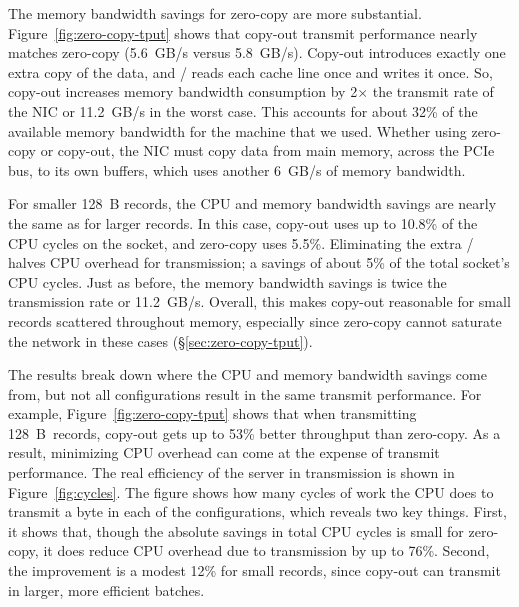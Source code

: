 The memory bandwidth savings for zero-copy are more substantial.
Figure~\ref{fig:zero-copy-tput} shows that copy-out transmit performance nearly
matches zero-copy (5.6~GB/s versus 5.8~GB/s). Copy-out introduces exactly one
extra copy of the data, and \memcpy/  reads each cache line once and writes it
once. So, copy-out increases memory bandwidth consumption
by 2$\times$ the transmit rate of the NIC or 11.2~GB/s in the worst case.  This
accounts for about 32\% of the available memory bandwidth for the machine that we used. Whether
using zero-copy or copy-out, the NIC must
copy data from main memory, across the PCIe bus, to its own buffers, which
uses another 6~GB/s of memory bandwidth.


For smaller 128~B records, the CPU and memory bandwidth savings are nearly the
same as for larger records.  In this case, copy-out uses up to 10.8\% of the
CPU cycles on the socket, and zero-copy uses 5.5\%.  Eliminating the extra
\memcpy/  halves CPU overhead for transmission; a savings of about 5\% of the
total socket's CPU cycles.  Just as before, the memory bandwidth savings is
twice the transmission rate or 11.2~GB/s.  Overall, this makes copy-out
reasonable for small records scattered throughout memory, especially since zero-copy cannot saturate the network in these cases (\S\ref{sec:zero-copy-tput}).


The results break down where the CPU and memory bandwidth savings come from,
but not all configurations result in the same transmit performance. For
example, Figure~\ref{fig:zero-copy-tput} shows that when transmitting
128~B~records, copy-out gets up to 53\% better throughput than zero-copy. As a result,
minimizing CPU overhead can come at the expense of transmit
performance.  The real efficiency of the server in transmission is shown in
Figure~\ref{fig:cycles}. The figure shows how many cycles of work the CPU does
to transmit a byte in each of the configurations, which reveals two key things.
First, it shows that, though the absolute savings in total CPU cycles is small
for zero-copy, it does reduce CPU overhead due to transmission by up to 76\%.
Second, the improvement is a modest 12\% for small records, since
copy-out can transmit in larger, more efficient batches.

